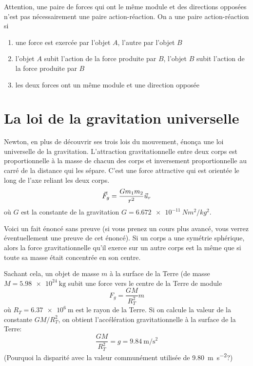 
Attention, une paire de forces qui ont le même module et des directions
opposées n'est pas nécessairement une paire action-réaction.  On a une paire
action-réaction si
\begin{enumerate}
  \item une force est exercée par l'objet $A$, l'autre par l'objet $B$
  \item l'objet $A$ subit l'action de la force produite par $B$, l'objet $B$
    subit l'action de la force produite par $B$
  \item les deux forces ont un même module et une direction opposée
\end{enumerate}



\section{La loi de la gravitation universelle}

Newton, en plus de découvrir ses trois lois du mouvement, énonça une loi
universelle de la gravitation.  L'attraction gravitationnelle entre deux corps
est proportionnelle à la masse de chacun des corps et inversement
proportionnelle au carré de la distance qui les sépare.  C'est une force
attractive qui est orientée le long de l'axe reliant les deux corps.
\[
  \vec{F}_g = \frac{Gm_1m_2}{r^2} \vec{u}_r
\]
où $G$ est la constante de la gravitation $G = \SI{6.672e-11}{Nm^2/kg^2}$.

Voici un fait énoncé sans preuve (si vous prenez un cours plus avancé, vous
verrez éventuellement une preuve de cet énoncé).  Si un corps a une symétrie
sphérique, alors la force gravitationnelle qu'il exerce sur un autre corps est
la même que si toute sa masse était concentrée en son centre.

Sachant cela, un objet de masse $m$ à la surface de la Terre (de masse $M =
\SI{5.98e24}{\kilo\gram}$ subit une force vers le centre de la Terre de module
\[
  F_g = \frac{GM}{R_T^2} m
\]
où $R_T = \SI{6.37e6}{\meter}$ est le rayon de la Terre.  Si on calcule la
valeur de la constante $GM/R_T^2$, on obtient l'accélération gravitationnelle
à la surface de la Terre:
\[
  \frac{GM}{R_T^2} = g = \SI{9.84}{\meter\per\second\squared} 
\]
(Pourquoi la disparité avec la valeur communément utilisée de
\SI{9.80}{\meter\per\second\squared}?)


